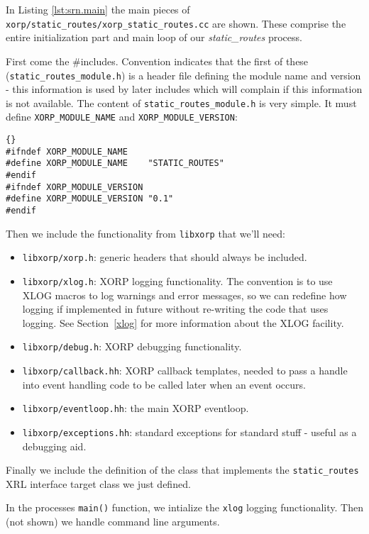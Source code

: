 \documentclass[11pt]{article}
\newcommand{\stt}{\tt\small}
\newcommand{\SR}{{\tt\small static\_routes}\xspace}
\newcommand{\SRI}{{\it static\_routes}\xspace}
\begin{document}
In Listing \ref{lst:srn.main} the main pieces of {\stt
xorp/static\_routes/xorp\_static\_routes.cc} are shown.  These
comprise the entire initialization part and main loop of our \SRI
process.

First come the \#includes. Convention indicates that the first
of these ({\stt static\_routes\_module.h}) is a header file defining the
module name and version - this
information is used by later includes which will complain if this
information is not available. The content of {\stt static\_routes\_module.h}
is very simple. It must define \verb=XORP_MODULE_NAME= and
\verb=XORP_MODULE_VERSION=:

\begin{lstlisting}[caption={Listing of {\stt xorp/static\_routes/static\_routes\_module.h} %
                                     \label{lst:srn.module} } ]{}
#ifndef XORP_MODULE_NAME
#define XORP_MODULE_NAME	"STATIC_ROUTES"
#endif
#ifndef XORP_MODULE_VERSION
#define XORP_MODULE_VERSION	"0.1"
#endif
\end{lstlisting}


Then we include the functionality from
{\stt libxorp} that we'll need:
\begin{itemize}
\item {\stt libxorp/xorp.h}: generic headers that should always be included.
\item {\stt libxorp/xlog.h}: XORP logging functionality.  The convention is to
  use XLOG macros to log warnings and error messages, so we can
  redefine how logging if implemented in future without re-writing
  the code that uses logging. See Section~\ref{xlog} for more information
  about the XLOG facility.
\item {\stt libxorp/debug.h}: XORP debugging functionality.
\item {\stt libxorp/callback.hh}: XORP callback templates, needed to pass a
  handle into event handling code to be called later when an event
  occurs.
\item {\stt libxorp/eventloop.hh}: the main XORP eventloop.
\item {\stt libxorp/exceptions.hh}: standard exceptions for standard stuff -
  useful as a debugging aid.
\end{itemize}
Finally we include the definition of the class that implements the \SR
XRL interface target class we just defined.

In the processes {\stt main()} function, we intialize the {\stt xlog}
logging functionality.  Then (not shown) we handle command line
arguments.  
\end{document}
